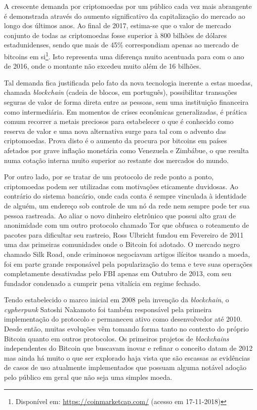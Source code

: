 \documentclass[a4paper,12pt]{monografia}
\theoremstyle{plain}
\theoremstyle{definition}
\theoremstyle{remark}
\begin{document}
A crescente demanda por criptomoedas por um p\'ublico cada vez mais abrangente \'e demonstrada atrav\'es do aumento significativo da capitaliza\c{c}\~ao do mercado ao longo dos \'ultimos anos.
Ao final de 2017, estima-se que o valor de mercado conjunto de todas as criptomoedas fosse superior \`a 800 bilh\~oes de d\'olares estadunidenses, sendo que mais de 45\% correspondiam apenas ao mercado de bitcoins em si\footnote{Dispon\'ivel em: \url{https://coinmarketcap.com/} (acesso em 17-11-2018)}.
Isto representa uma diferen\c{c}a muito acentuada para com o ano de 2016, onde o montante n\~{a}o excedeu muito al\'{e}m de 16 bilh\~{o}es.

Tal demanda fica justificada pelo fato da nova tecnologia inerente a estas moedas, chamada \textit{blockchain} (cadeia de blocos, em portugu\^{e}s), possibilitar transa\c{c}\~{o}es seguras de valor de forma direta entre as pessoas, sem uma institui\c{c}\~{a}o financeira como intermedi\'{a}ria.
Em momentos de crises econ\^{o}micas generalizadas, \'{e} pr\'{a}tica comum recorrer a metais preciosos para estabelecer o que \'{e} conhecido como reserva de valor e uma nova alternativa surge para tal com o advento das criptomoedas.
Prova disto \'{e} o aumento da procura por bitcoins em pa\'{i}ses afetados por grave infla\c{c}\~{a}o monet\'{a}ria como Venezuela e Zimbábue, o que resulta numa cota\c{c}\~{a}o interna muito superior ao restante dos mercados do mundo.

Por outro lado, por se tratar de um protocolo de rede ponto a ponto, criptomoedas podem ser utilizadas com motiva\c{c}\~{o}es eticamente duvidosas.
Ao contr\'{a}rio do sistema banc\'{a}rio, onde cada conta \'{e} sempre vinculada \`{a} identidade de algu\'{e}m, um endere\c{c}o sob controle de um n\'{o} da rede nem sempre pode ter sua pessoa rastreada.
Ao aliar o novo dinheiro eletr\^{o}nico que possui alto grau de anonimidade com um outro protocolo chamado Tor que obfusca o roteamento de pacotes para dificultar seu rastreio, Ross Ulbricht fundou em Fevereiro de 2011 uma das primeiras comunidades onde o Bitcoin foi adotado. O mercado negro chamado Silk Road, onde criminosos negociavam artigos il\'{i}citos usando a moeda, foi em parte grande respons\'{a}vel pela populariza\c{c}\~{a}o do tema e teve suas opera\c{c}\~{o}es completamente desativadas pelo FBI apenas em Outubro de 2013, com seu fundador condenado a cumprir pena vital\'{i}cia em regime fechado.

Tendo estabelecido o marco inicial em 2008 pela inven\c{c}\~{a}o da \textit{blockchain}, o \textit{cypherpunk} \cite{cypherpunk} Satoshi Nakamoto foi tamb\'{e}m respons\'{a}vel pela primeira implementa\c{c}\~{a}o do protocolo e permaneceu ativo como desenvolvedor at\'{e} 2010.
Desde ent\~{a}o, muitas evolu\c{c}\~{o}es v\^{e}m tomando forma tanto no contexto do pr\'{o}prio Bitcoin quanto em outros protocolos.
Os primeiros projetos de \textit{blockchains} independentes do Bitcoin que buscavam inovar e refinar o conceito datam de 2012 mas ainda h\'{a} muito o que ser explorado haja vista que s\~{a}o escassas as evid\^{e}ncias de casos de uso atualmente implementados que possuam alguma not\'{a}vel ado\c{c}\~{a}o pelo p\'{u}blico em geral que n\~{a}o seja uma simples moeda. 
\end{document}
